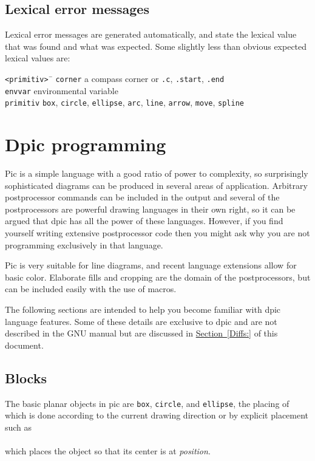 \documentclass[11pt]{article}
\newcommand{\ntt}[1]{\\\hbox{}\quad{\tt #1}}
\newcommand{\SR}[1]{\hyperref[#1]{Section~\ref*{#1}}}
\begin{document}
\subsection{Lexical error messages}
  Lexical error messages are generated automatically, and state the
lexical value that was found and what was expected.  Some
slightly less than obvious expected lexical values are:

\begin{tabbing}
\quad\=\hbox{\tt<primitiv>\ }\= \kill
\> {\tt corner} \> a compass corner or {\tt.c}, {\tt .start}, {\tt .end} \\
\> {\tt envvar} \> environmental variable \\
\> {\tt primitiv} \> {\tt box}, {\tt circle}, {\tt ellipse}, {\tt arc},
   {\tt line}, {\tt arrow}, {\tt move}, {\tt spline}
\end{tabbing}

\section{Dpic programming}
Pic is a simple language with a good ratio of power to complexity, so
surprisingly sophisticated diagrams can be produced in several areas of
application.
Arbitrary postprocessor commands can be included in the output and several
of the postprocessors are powerful drawing languages in their own
right, so it can be argued that dpic has all the power of these languages.
However, if you find yourself writing extensive postprocessor code then
you might ask why you are not programming exclusively in that language.

Pic is very suitable for line diagrams, and recent language extensions
allow for basic color.  Elaborate fills and cropping are the domain of
the postprocessors, but can be included easily with the use of macros.

The following sections are intended to help you become familiar
with dpic language features.  Some of these details
are exclusive to dpic and are not described in the GNU manual
but are discussed in \SR{Diffs:} of this document.

\subsection{Blocks}
The basic planar objects in pic are {\tt box}, {\tt circle}, and {\tt ellipse},
the placing of which is done according to the current drawing direction or
by explicit placement such as
\ntt{box at {\sl position}}\\
which places the object so that its center is at {\sl position}.
\end{document}
